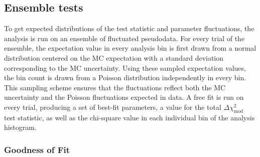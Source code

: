 \subsection{Ensemble tests}
\label{sec:three-flavor-ensemble}
To get expected distributions of the test statistic and parameter fluctuations, the analysis is run on an ensemble of fluctuated pseudodata. For every trial of the ensemble, the expectation value in every analysis bin is first drawn from a normal distribution centered on the MC expectation with a standard deviation corresponding to the MC uncertainty. Using these sampled expectation values, the bin count is drawn from a Poisson distribution independently in every bin. This sampling scheme ensures that the fluctuations reflect both the MC uncertainty and the Poisson fluctuations expected in data. A free fit is run on every trial, producing a set of best-fit parameters, a value for the total $\Delta \chi^2_{\mathrm{mod}}$ test statistic, as well as the chi-square value in each individual bin of the analysis histogram.



\subsubsection{Goodness of Fit}

